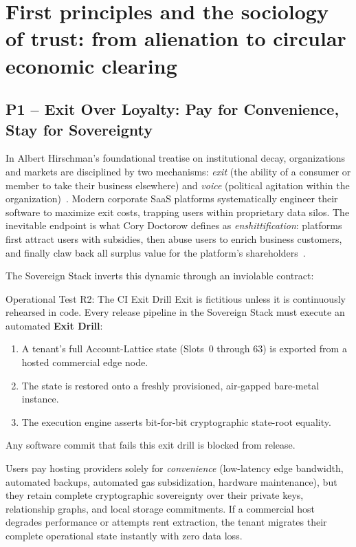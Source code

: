 \documentclass[a4paper,11pt,twoside,parskip=half-,headings=small]{scrartcl}
\begin{document}
\section{First principles and the sociology of trust: from alienation to circular economic clearing}
\label{sec:principles}

\subsection{P1 -- Exit Over Loyalty: Pay for Convenience, Stay for Sovereignty}

In Albert Hirschman's foundational treatise on institutional decay, organizations
and markets are disciplined by two mechanisms: \emph{exit} (the ability of a consumer
or member to take their business elsewhere) and \emph{voice} (political agitation
within the organization)~\cite{hirschman1970}. Modern corporate SaaS platforms
systematically engineer their software to maximize exit costs, trapping users
within proprietary data silos. The inevitable endpoint is what Cory Doctorow defines
as \emph{enshittification}: platforms first attract users with subsidies, then abuse
users to enrich business customers, and finally claw back all surplus value for the
platform's shareholders~\cite{doctorow2023}.

The Sovereign Stack inverts this dynamic through an inviolable contract:
\begin{keybox}{Operational Test R2: The CI Exit Drill}
Exit is fictitious unless it is continuously rehearsed in code. Every release
pipeline in the Sovereign Stack must execute an automated \textbf{Exit Drill}:
\begin{enumerate}
  \item A tenant's full Account-Lattice state (Slots~0 through 63) is exported from
a hosted commercial edge node.
  \item The state is restored onto a freshly provisioned, air-gapped bare-metal instance.
  \item The execution engine asserts bit-for-bit cryptographic state-root equality.
\end{enumerate}
Any software commit that fails this exit drill is blocked from release.
\end{keybox}

Users pay hosting providers solely for \emph{convenience} (low-latency edge bandwidth,
automated backups, automated gas subsidization, hardware maintenance), but they
retain complete cryptographic sovereignty over their private keys, relationship
graphs, and local storage commitments. If a commercial host degrades performance or
attempts rent extraction, the tenant migrates their complete operational state
instantly with zero data loss.
\end{document}
